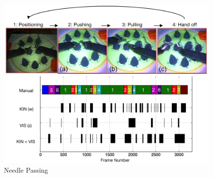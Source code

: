 \begin{figure}[t]
    \centering
	\includegraphics[width=\linewidth]{figures/needle_passing}
	\caption{Needle Passing}
	\label{fig:needlePassing}
	\vspace{-5pt}
\end{figure}


